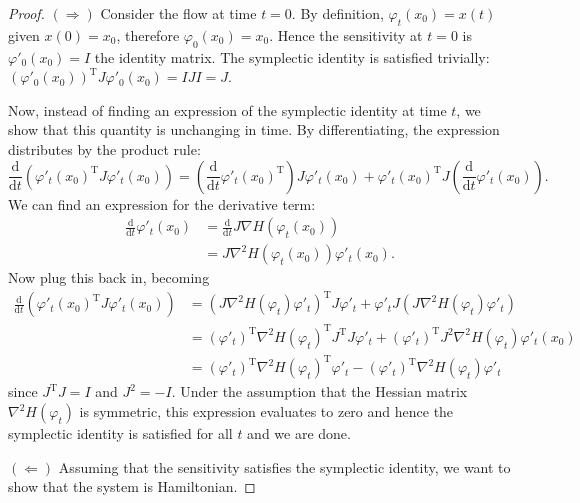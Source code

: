 \documentclass{report}
\theoremstyle{exampstyle} \newtheorem{example}[theorem]{Example}
\theoremstyle{exampstyle} \newtheorem{remark}[theorem]{Remark}
\theoremstyle{exampstyle} \newtheorem{definition}[theorem]{Definition}
\theoremstyle{exampstyle} \newtheorem{lemma}[theorem]{Lemma}
\begin{document}
\begin{proof}
$(\Rightarrow)$ Consider the flow at time $t=0$. By definition, $\varphi_t(x_0) = x(t)$ given $x(0) = x_0$,
therefore $\varphi_0(x_0) = x_0$. Hence the sensitivity at $t=0$ is $\varphi'_0(x_0) = I$ the identity matrix.
The symplectic identity is satisfied trivially: $(\varphi'_0(x_0))^\mathrm{T} J \varphi'_0(x_0) = IJI = J$.

Now, instead of finding an expression of the symplectic identity at time $t$,
we show that this quantity is unchanging in time.
By differentiating, the expression distributes by the product rule:
\begin{equation*}
	\frac{\mathrm{d}}{\mathrm{d}t} \left(
		\varphi'_t(x_0)^\mathrm{T} J \varphi'_t(x_0)
	\right) = \left(
		\frac{\mathrm{d}}{\mathrm{d}t} \varphi'_t(x_0)^\mathrm{T}
	\right) J \varphi'_t(x_0) + \varphi'_t(x_0)^\mathrm{T} J \left(
		\frac{\mathrm{d}}{\mathrm{d}t} \varphi'_t(x_0)
	\right).
\end{equation*}
We can find an expression for the derivative term:
\begin{align*}
	\frac{\mathrm{d}}{\mathrm{d}t} \varphi'_t(x_0) &= \frac{\mathrm{d}}{\mathrm{d}t} J \nabla H(\varphi_t(x_0)) \\
	&= J \nabla^2 H(\varphi_t(x_0)) \varphi'_t(x_0).
\end{align*}
Now plug this back in, becoming
\begin{align*}
	\frac{\mathrm{d}}{\mathrm{d}t} \left(
		\varphi'_t(x_0)^\mathrm{T} J \varphi'_t(x_0)
	\right) &= \left( J \nabla^2 H(\varphi_t)\varphi'_t \right)^\mathrm{T} J \varphi'_t 
	+ \varphi'_t J \left( 
		J \nabla^2 H(\varphi_t) \varphi'_t
  	\right) \\
	&= (\varphi'_t)^\mathrm{T} \nabla^2 H(\varphi_t)^\mathrm{T} J^\mathrm{T} J \varphi'_t
	+ (\varphi'_t)^\mathrm{T} J^2 \nabla^2 H(\varphi_t) \varphi'_t(x_0) \\
	&= (\varphi'_t)^\mathrm{T} \nabla^2 H(\varphi_t)^\mathrm{T} \varphi'_t - (\varphi'_t)^\mathrm{T} \nabla^2 H(\varphi_t) \varphi'_t
\end{align*}
since $J^\mathrm{T}J = I$ and $J^2 = -I$.
Under the assumption that the Hessian matrix $\nabla^2 H(\varphi_t)$ is symmetric,
this expression evaluates to zero and hence the symplectic identity is satisfied for all $t$ and we are done.

$(\Leftarrow)$ Assuming that the sensitivity satisfies the symplectic identity, we want to show that the system is Hamiltonian.

\end{proof}













\appendix
\end{document}
